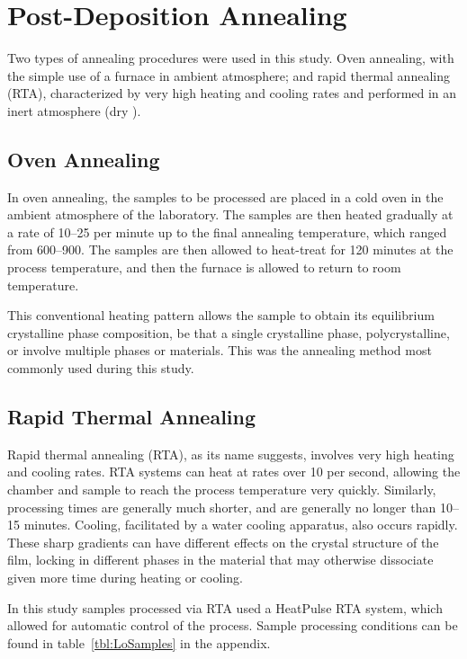 
\section{Post-Deposition Annealing}
\label{sec:SampFab-Annealing}

Two types of annealing procedures were used in this study. Oven annealing, with the simple use of a furnace in ambient atmosphere; and rapid thermal annealing (RTA), characterized by very high heating and cooling rates and performed in an inert atmosphere (dry ). 



\subsection{Oven Annealing}

In oven annealing, the samples to be processed are placed in a cold oven in the ambient atmosphere of the laboratory. The samples are then heated gradually at a rate of 10--25\degC{} per minute up to the final annealing temperature, which ranged from 600--900\degC{}. The samples are then allowed to heat-treat for 120 minutes at the process temperature, and then the furnace is allowed to return to room temperature. 

This conventional heating pattern allows the sample to obtain its equilibrium crystalline phase composition, be that a single crystalline phase, polycrystalline, or involve multiple phases or materials. This was the annealing method most commonly used during this study. 


\subsection{Rapid Thermal Annealing}

Rapid thermal annealing (RTA), as its name suggests, involves very high heating and cooling rates. RTA systems can heat at rates over 10\degC{} per second, allowing the chamber and sample to reach the process temperature very quickly. Similarly, processing times are generally much shorter, and are generally no longer than 10--15 minutes. Cooling, facilitated by a water cooling apparatus, also occurs rapidly. These sharp gradients can have different effects on the crystal structure of the film, locking in different phases in the material that may otherwise dissociate given more time during heating or cooling. 

In this study samples processed via RTA used a HeatPulse\textsuperscript{\texttrademark} RTA system, which allowed for automatic control of the process. Sample processing conditions can be found in table~\vref{tbl:LoSamples} in the appendix. 





